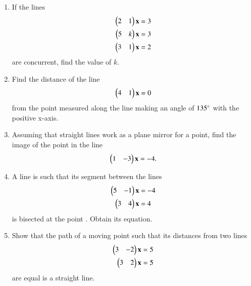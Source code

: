 \begin{enumerate}[label=\arabic*.,ref=\thesubsection.\theenumi]
\item If the lines 
\begin{align}
\begin{pmatrix}2 & 1\end{pmatrix}\mathbf{x}  = 3
\\
\begin{pmatrix}5 & k\end{pmatrix}\mathbf{x}  = 3
\\
\begin{pmatrix}3 & 1\end{pmatrix}\mathbf{x}  = 2
\end{align}
%
are concurrent, find the value of $k$.
%
\item Find the distance of the line
\begin{align}
\begin{pmatrix}4 & 1\end{pmatrix}\mathbf{x}  = 0
\end{align}
%
from the point  measured along the line making an angle of $135\degree$ with the positive x-axis.
\item Assuming that straight lines work as a plane mirror for a point, find the image of the point  in the line 
%
\begin{align}
\begin{pmatrix}1 & -3\end{pmatrix}\mathbf{x}  = -4.
\end{align}
%
\item A line is such that its segment between the lines %
\begin{align}
\begin{pmatrix}5 & -1\end{pmatrix}\mathbf{x}  &= -4
\\
\begin{pmatrix}3 & 4\end{pmatrix}\mathbf{x}  &= 4
\end{align}
%
is bisected at the point .  Obtain its equation.
%
\item Show that the path of a moving point such that its distances from two lines
%
\begin{align}
\begin{pmatrix}3 & -2\end{pmatrix}\mathbf{x}  &= 5
\\
\begin{pmatrix}3 & 2\end{pmatrix}\mathbf{x}  &= 5
\end{align}
%
are  equal is a straight line.
\end{enumerate}
%
